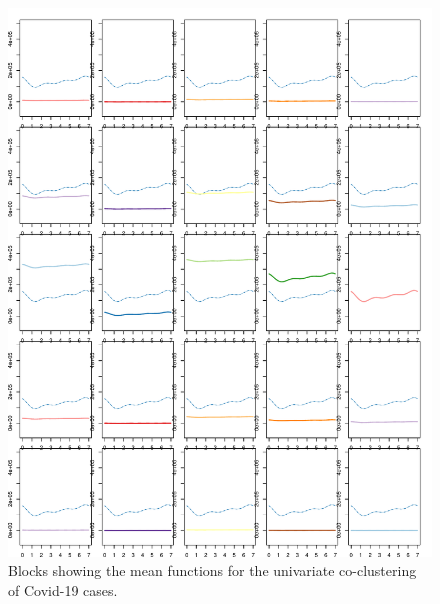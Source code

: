 \documentclass[12pt,a4paper]{article}
\begin{document}
%
%
\begin{figure}[H]
	\begin{center}
		\includegraphics[width=\columnwidth]{Cases_blocks.pdf}
		\caption{Blocks showing the mean functions for the univariate co-clustering of Covid-19 cases.}
		\label{fig6}
	\end{center}
\end{figure}
\end{document}
